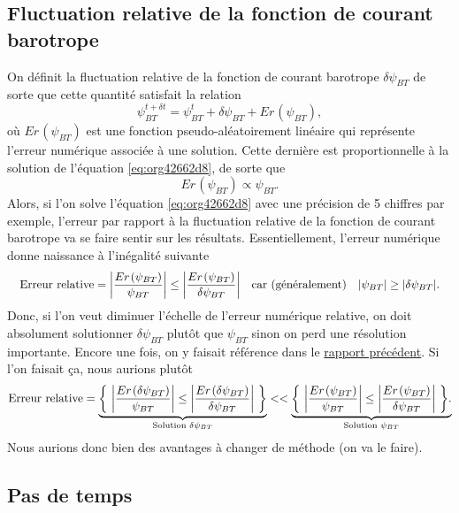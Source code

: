 \documentclass[10pt]{article}
\numberwithin{equation}{section}
\newcommand{\pt}{\hspace{1pt}} %
\begin{document}
\subsection{Fluctuation relative de la fonction de courant barotrope}
\label{sec:orga89f4aa}
On définit la fluctuation relative de la fonction de courant barotrope \(\delta \psi_{BT}\) de sorte que cette quantité satisfait la relation
\begin{equation}
   \psi_{BT}^{t+\delta t} = \psi_{BT}^t + \delta \psi_{BT} + Er\pt(\psi_{BT}),
\end{equation}
où \(Er\pt(\psi_{BT})\) est une fonction pseudo-aléatoirement linéaire qui représente l'erreur numérique associée à une solution.
Cette dernière est proportionnelle à la solution de l'équation \ref{eq:org42662d8}, de sorte que
\begin{equation}
    Er\pt(\psi_{BT}) \propto \psi_{BT}.
\end{equation}
Alors, si l'on solve l'équation \ref{eq:org42662d8} avec une précision de 5 chiffres par exemple, l'erreur par rapport à la fluctuation relative de la fonction de courant barotrope va se faire sentir sur les résultats.
Essentiellement, l'erreur numérique donne naissance à l'inégalité suivante
\begin{align}
   &&\text{Erreur relative} = \abs{\frac{Er\pt(\psi_{BT})}{\psi_{BT}}} \le \abs{ \frac{Er\pt(\psi_{BT})}{\delta \psi_{BT}} } &&\text{car (généralement)} && \abs{\psi_{BT}} \ge \abs{\delta \psi_{BT}}. &&
\end{align}
Donc, si l'on veut diminuer l'échelle de l'erreur numérique relative, on doit absolument solutionner \(\delta \psi_{BT}\) plutôt que \(\psi_{BT}\) sinon on perd une résolution importante.
Encore une fois, on y faisait référence dans le \href{rapport-2023-04-28.org}{rapport précédent}.
Si l'on faisait ça, nous aurions plutôt
\begin{align}
   \text{Erreur relative} = \underbrace{\qty{\ \abs{\frac{Er\pt(\delta\psi_{BT})}{\psi_{BT}}} \le \abs{ \frac{Er\pt(\delta\psi_{BT})}{\delta \psi_{BT}} }\ }}_\text{Solution $\delta \psi_{BT}$}
   <<
   \underbrace{\qty{\ \abs{\frac{Er\pt(\psi_{BT})}{\psi_{BT}}} \le \abs{ \frac{Er\pt(\psi_{BT})}{\delta \psi_{BT}} }\ }.}_\text{Solution $\psi_{BT}$}
\end{align}
Nous aurions donc bien des avantages à changer de méthode (on va le faire).

\subsection{Pas de temps}
\label{sec:orgd64b6cb}
\end{document}
